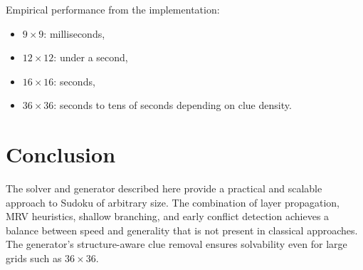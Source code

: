 \documentclass[11pt]{article}
\begin{document}
Empirical performance from the implementation:
\begin{itemize}
    \item $9 \times 9$: milliseconds,
    \item $12 \times 12$: under a second,
    \item $16 \times 16$: seconds,
    \item $36 \times 36$: seconds to tens of seconds depending on clue density.
\end{itemize}

\section{Conclusion}
The solver and generator described here provide a practical and scalable approach
to Sudoku of arbitrary size. The combination of layer propagation, MRV heuristics,
shallow branching, and early conflict detection achieves a balance between speed
and generality that is not present in classical approaches. The generator's
structure-aware clue removal ensures solvability even for large grids such as
$36 \times 36$.
\end{document}
